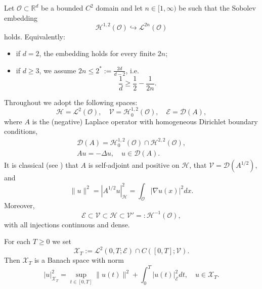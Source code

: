 \documentclass[reqno]{amsart}
\begin{document}
\begin{remark}\label{rem-1-spaces} \rm
Let $\mathcal{O} \subset \mathbb{R}^{d}$ be a bounded $C^{2}$ domain and let
$n \in [1, \infty)$ be such that the Sobolev embedding
\[
\mathcal{H}^{1,2}(\mathcal{O}) \hookrightarrow \mathcal{L}^{2n}(\mathcal{O})
\]
holds. Equivalently:
\begin{itemize}
\item if $d = 2$, the embedding holds for every finite $2n$;
\item if $d \ge 3$, we assume $2n \le 2^{\ast} := \frac{2d}{d-2}$, i.e.
\begin{equation}
\frac{1}{d} \geq \frac{1}{2} - \frac{1}{2n}.
\label{m_thm}
\end{equation}
\end{itemize}
Throughout we adopt the following spaces:
\[
\mathcal{H} = \mathcal{L}^{2}(\mathcal{O}), \quad
\mathcal{V} = \mathcal{H}_{0}^{1,2}(\mathcal{O}), \quad
\mathcal{E} = \mathcal{D}(A),
\]
where $A$ is the (negative) Laplace operator with homogeneous Dirichlet boundary
conditions,
\begin{equation} \label{1-1.1}
\begin{gathered}
\mathcal{D}(A) = \mathcal{H}_{0}^{1,2}(\mathcal{O})
\cap \mathcal{H}^{2,2}(\mathcal{O}),  \\
Au = -\Delta u, \quad u \in \mathcal{D}(A).
\end{gathered}
\end{equation}
It is classical (see \cite[Theorem 4.1.2, p.~79]{I.Vrabie}) that $A$ is
self-adjoint and positive on $\mathcal{H}$, that $\mathcal{V} = \mathcal{D}(A^{1/2})$,
and
\[
\|u\|^{2} = |A^{1/2}u|_{\mathcal{H}}^{2} = \int_{\mathcal{O}} |\nabla u(x)|^{2}  dx.
\]
Moreover,
\[
\mathcal{E} \subset \mathcal{V} \subset \mathcal{H} \subset \mathcal{V}'
=: \mathcal{H}^{-1}(\mathcal{O}),
\]
with all injections continuous and dense.
\end{remark}

For each $T \ge 0$ we set
\begin{equation}
\mathcal{X}_{T} := \mathcal{L}^{2}(0,T;\mathcal{E}) \cap C([0,T];\mathcal{V}).
\label{eqn-X_T}
\end{equation}
Then $\mathcal{X}_{T}$ is a Banach space with norm
\begin{equation}
|u|_{\mathcal{X}_{T}}^{2}
= \sup_{t \in [0,T]} \|u(t)\|^{2} + \int_{0}^{T} |u(t)|_{\mathcal{E}}^{2}  dt, \quad u \in \mathcal{X}_{T}.
\label{eqn-X_T-norm}
\end{equation}
\end{document}
